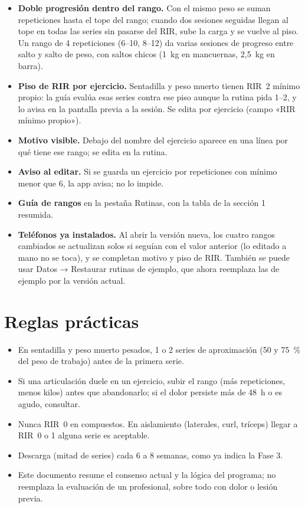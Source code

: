 \documentclass[11pt,a4paper]{article}
\begin{document}
\begin{itemize}
  \item \textbf{Doble progresión dentro del rango.} Con el mismo peso se suman repeticiones hasta el tope del rango; cuando dos sesiones seguidas llegan al tope en todas las series sin pasarse del RIR, sube la carga y se vuelve al piso. Un rango de 4 repeticiones (6--10, 8--12) da varias sesiones de progreso entre salto y salto de peso, con saltos chicos (1~kg en mancuernas, 2,5~kg en barra).
  \item \textbf{Piso de RIR por ejercicio.} Sentadilla y peso muerto tienen RIR~2 mínimo propio: la guía evalúa esas series contra ese piso aunque la rutina pida 1--2, y lo avisa en la pantalla previa a la sesión. Se edita por ejercicio (campo «RIR mínimo propio»).
  \item \textbf{Motivo visible.} Debajo del nombre del ejercicio aparece en una línea por qué tiene ese rango; se edita en la rutina.
  \item \textbf{Aviso al editar.} Si se guarda un ejercicio por repeticiones con mínimo menor que 6, la app avisa; no lo impide.
  \item \textbf{Guía de rangos} en la pestaña Rutinas, con la tabla de la sección 1 resumida.
  \item \textbf{Teléfonos ya instalados.} Al abrir la versión nueva, los cuatro rangos cambiados se actualizan solos si seguían con el valor anterior (lo editado a mano no se toca), y se completan motivo y piso de RIR. También se puede usar Datos → Restaurar rutinas de ejemplo, que ahora reemplaza las de ejemplo por la versión actual.
\end{itemize}

\section{Reglas prácticas}

\begin{itemize}
  \item En sentadilla y peso muerto pesados, 1 o 2 series de aproximación (50 y 75~\% del peso de trabajo) antes de la primera serie.
  \item Si una articulación duele en un ejercicio, subir el rango (más repeticiones, menos kilos) antes que abandonarlo; si el dolor persiste más de 48~h o es agudo, consultar.
  \item Nunca RIR~0 en compuestos. En aislamiento (laterales, curl, tríceps) llegar a RIR~0 o 1 alguna serie es aceptable.
  \item Descarga (mitad de series) cada 6 a 8 semanas, como ya indica la Fase 3.
  \item Este documento resume el consenso actual y la lógica del programa; no reemplaza la evaluación de un profesional, sobre todo con dolor o lesión previa.
\end{itemize}
\end{document}
